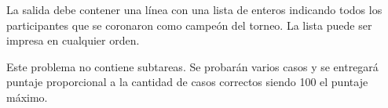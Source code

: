 \documentclass{oci}
\begin{document}
\begin{outputDescription}
  La salida debe contener una línea con una lista de enteros
  indicando todos los participantes que se coronaron como campeón del torneo.
  La lista puede ser impresa en cualquier orden.
\end{outputDescription}

\begin{scoreDescription}
  Este problema no contiene subtareas.
  Se probarán varios casos y se entregará puntaje proporcional a la cantidad de casos correctos
  siendo 100 el puntaje máximo.
\end{scoreDescription}

\begin{sampleDescription}
\end{sampleDescription}
\end{document}
